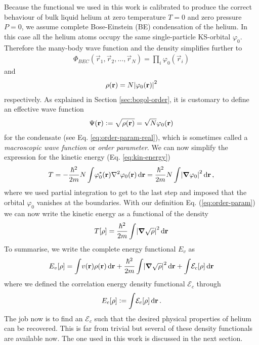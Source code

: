 		Because the functional we used in this work is calibrated to produce the correct behaviour of bulk liquid helium at zero temperature $T=0$ and zero pressure $P=0$, we assume complete Bose-Einstein (BE) condensation of the helium. In this case all the helium atoms occupy the same single-particle KS-orbital $\varphi_0$. Therefore the many-body wave function and the density simplifies further to
		\begin{align}
			\Phi_{BEC}(\vec{r}_1,\vec{r}_2,\ldots,\vec{r}_N)=\prod_i\varphi_0(\vec{r}_i)
		\end{align}
		 and
		 \begin{align}
		 	\rho(\vec{r})=N\absolutevalue{\varphi_0(\vec{r})}^2
		 \end{align}
		 respectively. As explained in Section \ref{sec:bogol-order}, it is customary to define an effective wave function
		\begin{align}
			\Psi(\vec{r})\vcentcolon=\sqrt{\rho(\vec{r})}=\sqrt{N}\varphi_0(\vec{r}) \label{eq:order-param}	
		\end{align}
	 	for the condensate (see Eq. \ref{eq:order-param-real}), which is sometimes called a \emph{macroscopic wave function} or \emph{order parameter}. We can now simplify the expression for the kinetic energy (Eq. \ref{eq:kin-energy})
		\begin{align}
			T = -\frac{\hbar^2}{2m} N\int\! \varphi_0^*(\vec{r})\laplacian \varphi_0(\vec{r})\diff{r}
			 = \frac{\hbar^2}{2m} N\int\! \abs{\grad{\varphi_0}}^2\diff{r}\,, \label{eq5}
		\end{align}	
		where we used partial integration to get to the last step and imposed that the orbital $\varphi_0$ vanishes at the boundaries. With our definition Eq. (\ref{eq:order-param}) we can now write the kinetic energy as a functional of the density
		\begin{align}
			T[\rho] = \frac{\hbar^2}{2m} \int\! \abs{\grad{\sqrt{\rho}}}^2\diff{r} 
		\end{align}
		To summarise, we write the complete energy functional $E_v$ as
		\begin{align}
			E_v[\rho] = \int\!v(\vec{r})\rho(\vec{r})\diff{r} + \frac{\hbar^2}{2m} \int\! \abs{\grad{\sqrt{\rho}}}^2\diff{r} + \int\!\mathcal{E}_c[\rho]\diff{r} \label{eq:ks-tot-energy}
		\end{align}
		where we defined the correlation energy density functional $\mathcal{E}_c$ through
		\begin{align}
			E_c[\rho] \vcentcolon= \int\!\mathcal{E}_c[\rho]\diff{r}\,.
		\end{align}
		The job now is to find an $\mathcal{E}_c$ such that the desired physical properties of helium can be recovered. This is far from trivial but several of these density functionals are available now. The one used in this work is discussed in the next section.
	
